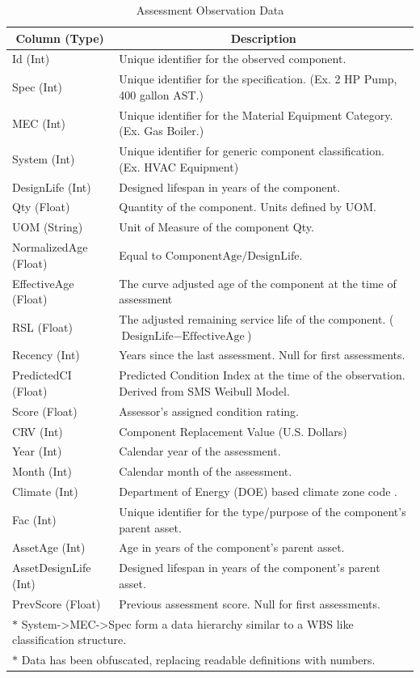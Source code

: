 \documentclass[NewProceedings,letterpaper,NoPageNumbers,NoLineNumbers, DoubleSpace]{ascelike-new}
\begin{document}
\begin{table}[htbp]
\caption{Assessment Observation Data}
\label{table:assembly}
\centering
\small
\renewcommand{\arraystretch}{1.25}
\begin{tabular}{l p{4in}}
\hline\hline
\multicolumn{1}{c}{Column (Type)} &
\multicolumn{1}{c}{Description} \\
\hline
Id (Int) & Unique identifier for the observed component.\\
Spec (Int) & Unique identifier for the specification. (Ex. 2 HP Pump, 400 gallon AST.) \\
MEC (Int) & Unique identifier for the Material Equipment Category. (Ex. Gas Boiler.) \\
System (Int) & Unique identifier for generic component classification. (Ex. HVAC Equipment) \\
DesignLife (Int) & Designed lifespan in years of the component. \\
Qty (Float) & Quantity of the component. Units defined by UOM. \\
UOM (String) & Unit of Measure of the component Qty. \\
NormalizedAge (Float) & Equal to $\text{ComponentAge} / \text{DesignLife}$. \\
EffectiveAge (Float) & The curve adjusted age of the component at the time of assessment \\
RSL (Float) & The adjusted remaining service life of the component. ($\text{DesignLife} - \text{EffectiveAge}$) \\
Recency (Int) & Years since the last assessment. Null for first assessments. \\
PredictedCI (Float) & Predicted Condition Index at the time of the observation. Derived from SMS Weibull Model. \\
Score (Float) & Assessor's assigned condition rating. \\
CRV (Int) & Component Replacement Value (U.S. Dollars) \\
Year (Int) & Calendar year of the assessment. \\
Month (Int) & Calendar month of the assessment. \\
Climate (Int) & Department of Energy (DOE) based climate zone code \cite{doe_building_america_climate_guidance}. \\
Fac (Int) & Unique identifier for the type/purpose of the component's parent asset. \\
AssetAge (Int) & Age in years of the component's parent asset. \\
AssetDesignLife (Int) & Designed lifespan in years of the component's parent asset. \\
PrevScore (Float) & Previous assessment score. Null for first assessments. \\
\hline
\multicolumn{2}{l}{$\ast$ System->MEC->Spec form a data hierarchy similar to a WBS like classification structure.} \\
\multicolumn{2}{l}{$\ast$ Data has been obfuscated, replacing readable definitions with numbers.} \\
\hline\hline
\end{tabular}
\normalsize
\end{table}
\end{document}
